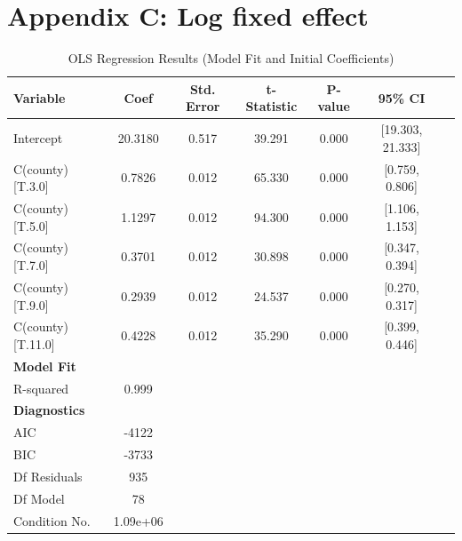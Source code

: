 \documentclass{article}
\begin{document}
\section{Appendix C: Log fixed effect}

\begin{table}[ht]
	\centering
	\caption{OLS Regression Results (Model Fit and Initial Coefficients)}
	\begin{tabular}{lcccccc}
		\hline
		\textbf{Variable}    & \textbf{Coef} & \textbf{Std. Error} & \textbf{t-Statistic} & \textbf{P-value} & \textbf{95\% CI} \\
		\hline
		Intercept            & 20.3180       & 0.517               & 39.291               & 0.000            & [19.303, 21.333] \\
		C(county)[T.3.0]     & 0.7826        & 0.012               & 65.330               & 0.000            & [0.759, 0.806]   \\
		C(county)[T.5.0]     & 1.1297        & 0.012               & 94.300               & 0.000            & [1.106, 1.153]   \\
		C(county)[T.7.0]     & 0.3701        & 0.012               & 30.898               & 0.000            & [0.347, 0.394]   \\
		C(county)[T.9.0]     & 0.2939        & 0.012               & 24.537               & 0.000            & [0.270, 0.317]   \\
		C(county)[T.11.0]    & 0.4228        & 0.012               & 35.290               & 0.000            & [0.399, 0.446]   \\
		\hline
		\textbf{Model Fit}   &               &                     &                      &                  &                  \\
		\hline
		R-squared            & 0.999         &                     &                      &                  &                  \\
		\textbf{Diagnostics} &               &                     &                      &                  &                  \\
		\hline
		AIC                  & -4122         &                     &                      &                  &                  \\
		BIC                  & -3733         &                     &                      &                  &                  \\
		Df Residuals         & 935           &                     &                      &                  &                  \\
		Df Model             & 78            &                     &                      &                  &                  \\
		Condition No.        & 1.09e+06      &                     &                      &                  &                  \\
		\hline
	\end{tabular}
\end{table}
\end{document}
